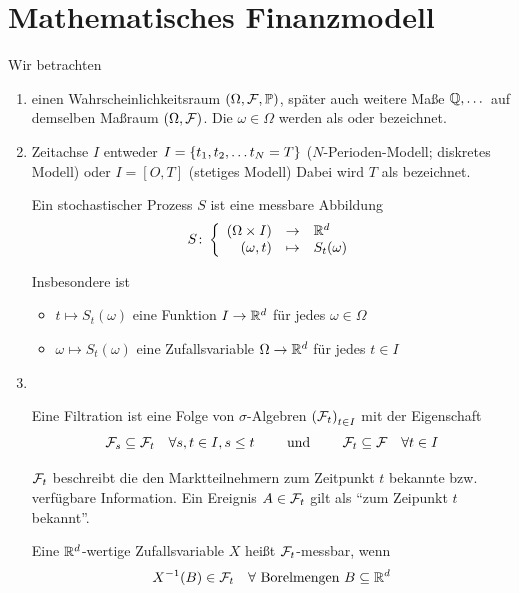\section{Mathematisches Finanzmodell}

Wir betrachten
\begin{enumerate}[leftmargin=*]
	\item einen Wahrscheinlichkeitsraum $(\Omega, \mathcal{F}, \mathbb{P})$, später auch weitere Maße $\mathbb{Q}, \dots$ auf demselben Maßraum $(\Omega, \mathcal{F})$. Die $\omega \in \Omega$ werden als  oder  bezeichnet.
	\item Zeitachse $I$ entweder $I = \left\{ t_1, t_2, \dots t_N = T \right\}$ ($N$-Perioden-Modell; diskretes Modell) oder $I = [O,T]$ (stetiges Modell)
	Dabei wird $T$ als  bezeichnet.
	\begin{definition}
		Ein stochastischer Prozess $S$ ist eine messbare Abbildung 
		\begin{equation*}
		S \colon \left\lbrace \begin{array}{rcl} (\Omega \times I) & \to & \mathbb{R}^d \\(\omega, t) & \mapsto & S_t(\omega) \end{array} \right.
		\end{equation*}
	\end{definition}
	Insbesondere ist 
	\begin{itemize}[nolistsep, topsep=-\parskip]
		\item $t \mapsto S_t(\omega)$ eine Funktion $I \to \mathbb{R}^d$ für jedes $\omega \in \Omega$ 
		\item $\omega \mapsto S_t(\omega)$ eine Zufallsvariable $\Omega \to \mathbb{R}^d$ für jedes $t \in I$
	\end{itemize}
	\item ~\vspace{-2em}
	 \begin{definition}[Filtration]
	 	Eine Filtration ist eine Folge von $\sigma$-Algebren $\left( \mathcal{F}_t \right)_{t \in I}$ mit der Eigenschaft
	 	\begin{equation*}
	 	\mathcal{F}_s \subseteq \mathcal{F}_t \quad \forall s,t \in I, s \le t \qquad \text{ und } \qquad \mathcal{F}_t \subseteq \mathcal{F} \quad \forall t \in I
	 	\end{equation*}
	 \end{definition}
 	\begin{*interpretation}
 		$\mathcal{F}_t$ beschreibt die den Marktteilnehmern zum Zeitpunkt $t$ bekannte bzw. verfügbare Information. Ein Ereignis $A \in \mathcal{F}_t$ gilt als \enquote{zum Zeipunkt $t$ bekannt}.
 	\end{*interpretation}
	
	\begin{*erinnerung}
		Eine $\mathbb{R}^d$-wertige Zufallsvariable $X$ heißt $\mathcal{F}_t$-messbar, wenn
		\begin{equation*}
		X^{-1}(B) \in \mathcal{F}_t \quad \forall \text{ Borelmengen } B \subseteq \mathbb{R}^d
		\end{equation*}
	\end{*erinnerung}


\end{enumerate}
